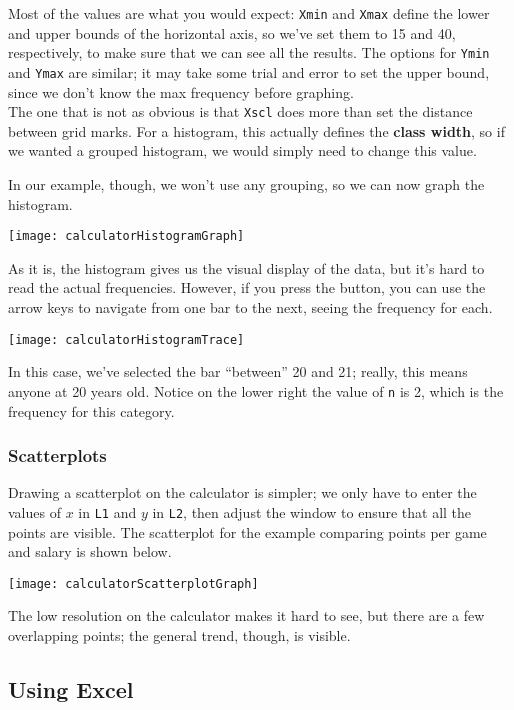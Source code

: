 Most of the values are what you would expect: \texttt{Xmin} and \texttt{Xmax} define the lower and upper bounds of the horizontal axis, so we've set them to 15 and 40, respectively, to make sure that we can see all the results.  The options for \texttt{Ymin} and \texttt{Ymax} are similar; it may take some trial and error to set the upper bound, since we don't know the max frequency before graphing.\\

The one that is not as obvious is that \texttt{Xscl} does more than set the distance between grid marks.  For a histogram, this actually defines the \textbf{class width}, so if we wanted a grouped histogram, we would simply need to change this value.

In our example, though, we won't use any grouping, so we can now graph the histogram.
\begin{center}
\texttt{[image: calculatorHistogramGraph]}
\end{center}

As it is, the histogram gives us the visual display of the data, but it's hard to read the actual frequencies.  However, if you press the  button, you can use the arrow keys to navigate from one bar to the next, seeing the frequency for each.
\begin{center}
\texttt{[image: calculatorHistogramTrace]}
\end{center}
In this case, we've selected the bar ``between'' 20 and 21; really, this means anyone at 20 years old.  Notice on the lower right the value of \texttt{n} is 2, which is the frequency for this category.

\subsubsection{Scatterplots}
Drawing a scatterplot on the calculator is simpler; we only have to enter the values of $x$ in \texttt{L1} and $y$ in \texttt{L2}, then adjust the window to ensure that all the points are visible.  The scatterplot for the example comparing points per game and salary is shown below.
\begin{center}
\texttt{[image: calculatorScatterplotGraph]}
\end{center}
The low resolution on the calculator makes it hard to see, but there are a few overlapping points; the general trend, though, is visible.
\pagebreak

\subsection{Using Excel}
